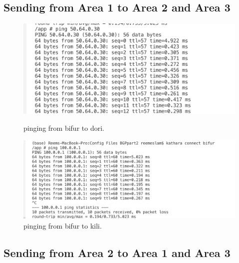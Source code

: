 \subsection{Sending from Area 1 to Area 2 and Area 3}

\begin{figure}[H]
  \centering
  \begin{minipage}[b]{0.45\textwidth}
    \includegraphics[width=\textwidth]{Images/bifur2Dori.png}
    \caption{pinging from bifur to dori.}
  \end{minipage}
  \hfill
  \begin{minipage}[b]{0.45\textwidth}
    \includegraphics[width=\textwidth]{Images/bifur2kili.png}
    \caption{pinging from bifur to kili.}
  \end{minipage}
\end{figure}

\subsection{Sending from Area 2 to Area 1 and Area 3}

